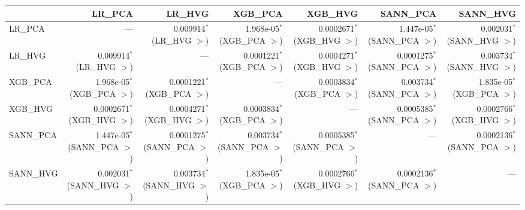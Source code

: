 \begin{tabular}{lrrrrrr}
\toprule
 & LR_PCA & LR_HVG & XGB_PCA & XGB_HVG & SANN_PCA & SANN_HVG \\
\midrule
LR_PCA & --- & 0.009914$^{*}$ (LR_HVG $>$) & 1.968e-05$^{*}$ (XGB_PCA $>$) & 0.0002671$^{*}$ (XGB_HVG $>$) & 1.447e-05$^{*}$ (SANN_PCA $>$) & 0.002031$^{*}$ (SANN_HVG $>$) \\
LR_HVG & 0.009914$^{*}$ (LR_HVG $>$) & --- & 0.0001221$^{*}$ (XGB_PCA $>$) & 0.0004271$^{*}$ (XGB_HVG $>$) & 0.0001275$^{*}$ (SANN_PCA $>$) & 0.003734$^{*}$ (SANN_HVG $>$) \\
XGB_PCA & 1.968e-05$^{*}$ (XGB_PCA $>$) & 0.0001221$^{*}$ (XGB_PCA $>$) & --- & 0.0003834$^{*}$ (XGB_PCA $>$) & 0.003734$^{*}$ (SANN_PCA $>$) & 1.835e-05$^{*}$ (XGB_PCA $>$) \\
XGB_HVG & 0.0002671$^{*}$ (XGB_HVG $>$) & 0.0004271$^{*}$ (XGB_HVG $>$) & 0.0003834$^{*}$ (XGB_PCA $>$) & --- & 0.0005385$^{*}$ (SANN_PCA $>$) & 0.0002766$^{*}$ (XGB_HVG $>$) \\
SANN_PCA & 1.447e-05$^{*}$ (SANN_PCA $>$) & 0.0001275$^{*}$ (SANN_PCA $>$) & 0.003734$^{*}$ (SANN_PCA $>$) & 0.0005385$^{*}$ (SANN_PCA $>$) & --- & 0.0002136$^{*}$ (SANN_PCA $>$) \\
SANN_HVG & 0.002031$^{*}$ (SANN_HVG $>$) & 0.003734$^{*}$ (SANN_HVG $>$) & 1.835e-05$^{*}$ (XGB_PCA $>$) & 0.0002766$^{*}$ (XGB_HVG $>$) & 0.0002136$^{*}$ (SANN_PCA $>$) & --- \\
\bottomrule
\end{tabular}